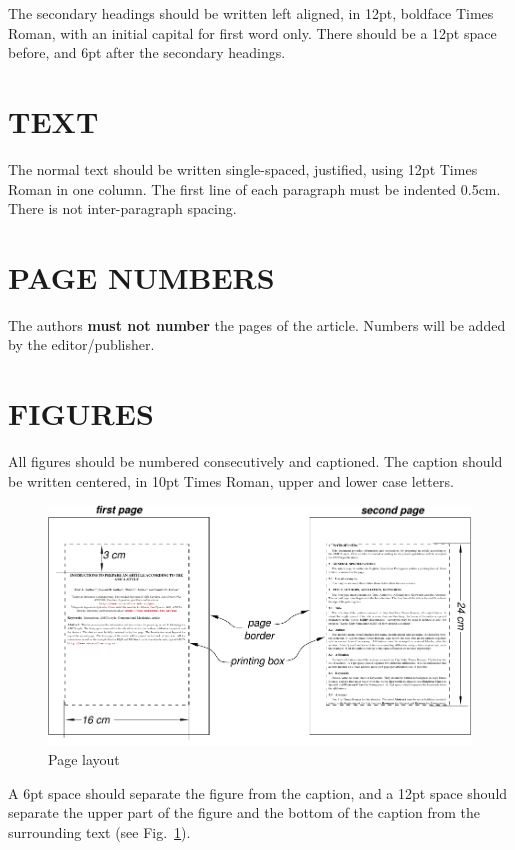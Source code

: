 \documentclass[oneside,a4paper,english,links]{amca}
\begin{document}
The secondary headings should be written left aligned, in 12pt,
boldface Times Roman, with an initial capital for first word only. There
should be a 12pt space before, and 6pt after the secondary headings.

\section{TEXT}

The normal text should be written single-spaced, justified, using 12pt
Times Roman in one column. The first line of each paragraph must be
indented 0.5cm. There is not inter-paragraph spacing.

\section{PAGE NUMBERS}

The authors {\bf must not number} the pages of the article. Numbers will
be added by the editor/publisher. 

\section{FIGURES}

All figures should be numbered consecutively and captioned. The
caption should be written centered, in 10pt Times Roman, upper and lower
case letters.

\begin{figure}[htb]
\centerline{\includegraphics{firstpage}}
\caption{Page layout}
\label{fg:figure}
\end{figure}

A 6pt space should separate the figure from the caption, and a
12pt space should separate the upper part of the figure and the
bottom of the caption from the surrounding text (see
Fig.~\ref{fg:figure}).
\end{document}
